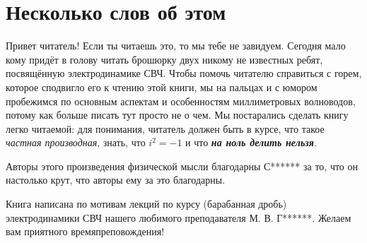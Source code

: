 \chapter*{Несколько слов об этом}
    Привет читатель! Если ты читаешь это, то мы тебе не завидуем. Сегодня мало
    кому придёт в голову читать брошюрку двух никому не известных ребят,
    посвящённую электродинамике СВЧ. Чтобы помочь читателю справиться с горем,
    которое сподвигло его к чтению этой книги, мы на пальцах и с юмором
    пробежимся по основным аспектам и особенностям миллиметровых волноводов,
    потому как больше писать тут просто не о чем. Мы постарались сделать книгу
    легко читаемой: для понимания, читатель должен быть в курсе, что такое
    \emph{частная производная}, знать, что \( i^2 = -1 \) и что
    \emph{\bfseries на ноль делить нельзя}.

    Авторы этого произведения физической мысли благодарны С****** за то, что он
    настолько крут, что авторы ему за это благодарны.

    Книга написана по мотивам лекций по курсу (барабанная дробь) электродинамики
    СВЧ нашего любимого преподавателя М. В. Г******. Желаем вам приятного
    времяпреповождения!


